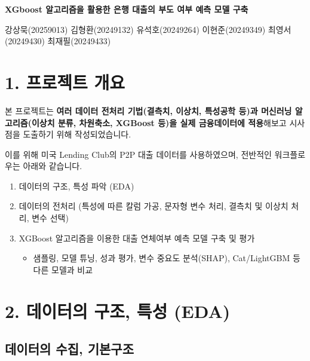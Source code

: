 \documentclass[
  a4paper,
  DIV=11,
  numbers=noendperiod]{scrreprt}
\providecommand{\tightlist}{%
  \setlength{\itemsep}{0pt}\setlength{\parskip}{0pt}}\usepackage{longtable,booktabs,array}
\begin{document}

\textbf{XGboost 알고리즘을 활용한 은행 대출의 부도 여부 예측 모델 구축}

강상묵(20259013) 김형환(20249132) 유석호(20249264) 이현준(20249349)
최영서(20249430) 최재필(20249433)

\section*{1. 프로젝트 개요}\label{uxd504uxb85cuxc81duxd2b8-uxac1cuxc694}


본 프로젝트는 \textbf{여러 데이터 전처리 기법(결측치, 이상치, 특성공학
등)과 머신러닝 알고리즘(이상치 분류, 차원축소, XGBoost 등)을 실제
금융데이터에 적용}해보고 시사점을 도출하기 위해 작성되었습니다.

이를 위해 미국 Lending Club의 P2P 대출 데이터를 사용하였으며, 전반적인
워크플로우는 아래와 같습니다.

\begin{enumerate}
\def\labelenumi{\arabic{enumi}.}
\tightlist
\item
  데이터의 구조, 특성 파악 (EDA)
\item
  데이터의 전처리 (특성에 따른 칼럼 가공, 문자형 변수 처리, 결측치 및
  이상치 처리, 변수 선택)
\item
  XGBoost 알고리즘을 이용한 대출 연체여부 예측 모델 구축 및 평가

  \begin{itemize}
  \tightlist
  \item
    샘플링, 모델 튜닝, 성과 평가, 변수 중요도 분석(SHAP), Cat/LightGBM
    등 다른 모델과 비교
  \end{itemize}
\end{enumerate}

\section*{2. 데이터의 구조, 특성
(EDA)}\label{uxb370uxc774uxd130uxc758-uxad6cuxc870-uxd2b9uxc131-eda}


\subsection*{데이터의 수집,
기본구조}\label{uxb370uxc774uxd130uxc758-uxc218uxc9d1-uxae30uxbcf8uxad6cuxc870}
\end{document}
